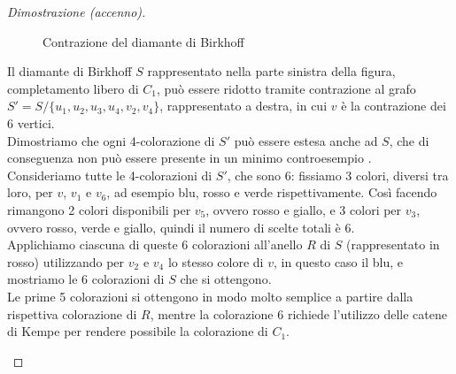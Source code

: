 \documentclass[a4paper,12pt,titlepage]{report}
\begin{document}
\begin{proof}[Dimostrazione (accenno)]
\begin{figure}[H]
    		\vspace{0.5cm}
    		\caption{Contrazione del diamante di Birkhoff}
    	\end{figure}
    	Il diamante di Birkhoff $S$ rappresentato nella parte sinistra della figura, completamento libero di $C_1$, può essere ridotto tramite contrazione al grafo $S' = S/\{u_1, u_2, u_3, u_4, v_2, v_4\}$, rappresentato a destra, in cui $v$ è la contrazione dei 6 vertici.
    	\\Dimostriamo che ogni 4-colorazione di $S'$ può essere estesa anche ad $S$, che di conseguenza non può essere presente in un minimo controesempio {\bfseries \cite{Nanjwenge}}.
    	\\Consideriamo tutte le 4-colorazioni di $S'$, che sono 6: fissiamo 3 colori, diversi tra loro, per $v$, $v_1$ e $v_6$, ad esempio blu, rosso e verde rispettivamente. Così facendo rimangono 2 colori disponibili per $v_5$, ovvero rosso e giallo, e 3 colori per $v_3$, ovvero rosso, verde e giallo, quindi il numero di scelte totali è 6.
    	\\Applichiamo ciascuna di queste 6 colorazioni all'anello $R$ di $S$ (rappresentato in rosso) utilizzando per $v_2$ e $v_4$ lo stesso colore di $v$, in questo caso il blu, e mostriamo le 6 colorazioni di $S$ che si ottengono.
    	\\Le prime 5 colorazioni si ottengono in modo molto semplice a partire dalla rispettiva colorazione di $R$, mentre la colorazione 6 richiede l'utilizzo delle catene di Kempe per rendere possibile la colorazione di $C_1$.
    	\begin{figure}[H]
    		\centering
    		\begin{subfigure}{0.3\textwidth}
    			\centering
\end{subfigure}
\end{figure}
\end{proof}
\end{document}
